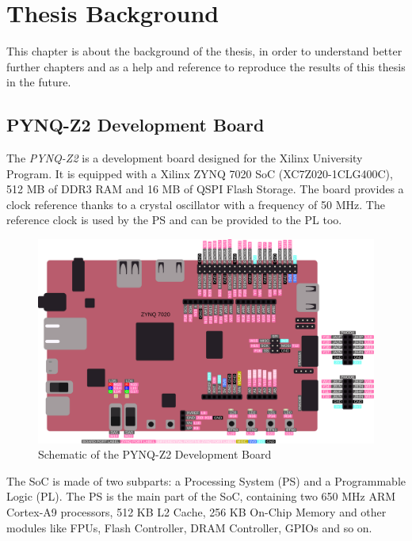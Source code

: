 \nocite{1030194}
\nocite{1369494}
\nocite{7969976}

\chapter{Thesis Background}
\label{sec:backgroundthesis}

This chapter is about the background of the thesis, in order to understand better further chapters and as a help and reference to reproduce the results of this thesis in the future. 

\section{PYNQ-Z2 Development Board}
\label{sec:pynq}
The \textit{PYNQ-Z2} is a development board designed for the Xilinx University Program. It is equipped with a Xilinx ZYNQ 7020 SoC (XC7Z020-1CLG400C), 512 MB of DDR3 RAM and 16 MB of QSPI Flash Storage. The board provides a clock reference thanks to a crystal oscillator with a frequency of 50 MHz. The reference clock is used by the PS and can be provided to the PL too. 

\begin{figure}[H]
\centering
\includegraphics[width=0.7\linewidth]{images/chapter3/PINOUT.pdf}
\caption{Schematic of the PYNQ-Z2 Development Board}
\label{fig:pynqz2}
\end{figure}

The SoC is made of two subparts: a Processing System (PS) and a Programmable Logic (PL). The PS is the main part of the SoC, containing two 650 MHz ARM Cortex-A9 processors, 512 KB L2 Cache, 256 KB On-Chip Memory and other modules like FPUs, Flash Controller, DRAM Controller, GPIOs and so on.


